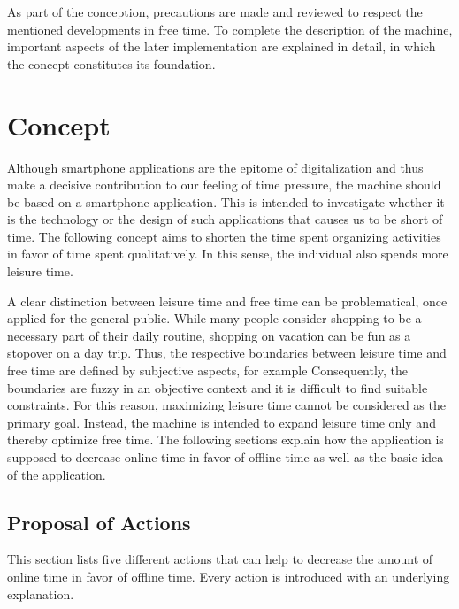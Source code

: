 \documentclass[12pt,numbers=noenddot,parskip,bibliography=totocnumbered,listof=totocnumbered]{scrreprt}
\begin{document}
As part of the conception, precautions are made and reviewed to respect the mentioned developments in free time. To complete the description of the machine, important aspects of the later implementation are explained in detail, in which the concept constitutes its foundation.

\section{Concept}
Although smartphone applications are the epitome of digitalization and thus make a decisive contribution to our feeling of time pressure, the machine should be based on a smartphone application. This is intended to investigate whether it is the technology or the design of such applications that causes us to be short of time. The following concept aims to shorten the time spent organizing activities in favor of time spent qualitatively. In this sense, the individual also spends more leisure time. 

A clear distinction between leisure time and free time can be problematical, once applied for the general public. While many people consider shopping to be a necessary part of their daily routine, shopping on vacation can be fun as a stopover on a day trip. Thus, the respective boundaries between leisure time and free time are defined by subjective aspects, for example  Consequently, the boundaries are fuzzy in an objective context and it is difficult to find suitable constraints. For this reason, maximizing leisure time cannot be considered as the primary goal. Instead, the machine is intended to expand leisure time only and thereby optimize free time. The following sections explain how the application is supposed to decrease online time in favor of offline time as well as the basic idea of the application.

\subsection{Proposal of Actions}
This section lists five different actions that can help to decrease the amount of online time in favor of offline time. Every action is introduced with an underlying explanation.
\end{document}
